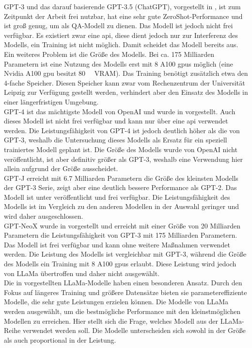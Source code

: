 GPT-3 und das darauf basierende GPT-3.5 (ChatGPT), vorgestellt in \citet{gpt3}, ist zum Zeitpunkt der Arbeit frei nutzbar, hat eine sehr gute ZeroShot-Performance und ist groß genug, um als QA-Modell zu dienen.
Das Modell ist jedoch nicht frei verfügbar.
Es existiert zwar eine \ac{api}, diese dient jedoch nur zur Interferenz des Modells, ein Training ist nicht möglich.
Damit scheidet das Modell bereits aus.
Ein weiteres Problem ist die Größe des Modells.
Bei ca. 175 Milliarden Parametern ist eine Nutzung des Modells erst mit 8 A100 \ac{gpu}s möglich (eine Nvidia A100 \ac{gpu} besitzt \SI{80}{\giga\byte} VRAM).
Das Training benötigt zusätzlich etwa den 4-fache Speicher.
Diesen Speicher kann zwar vom Rechenzentrum der Universität Leipzig zur Verfügung gestellt werden, verhindert aber den Einsatz des Modells in einer längerfristigen Umgebung.\\

GPT-4 ist das mächtigste Modell von OpenAI und wurde in \citet{gpt4} vorgestellt.
Auch dieses Modell ist nicht frei verfügbar und kann nur über eine \ac{api} verwendet werden.
Die Leistungsfähigkeit von GPT-4 ist jedoch deutlich höher als die von GPT-3, weshalb die Untersuchung dieses Modells als Ersatz für ein speziell trainiertes Modell geplant ist.
Die Größe des Modells wurde von OpenAI nicht veröffentlicht, ist aber definitiv größer als GPT-3, weshalb eine Verwendung hier allein aufgrund der Größe ausscheidet.\\

GPT-J erreicht mit \SI{6,7}{} Milliarden Parametern die Größe des kleinsten Modells der GPT-3 Serie, zeigt aber eine deutlich bessere Performance als GPT-2.
Das Modell ist unter \citet{gptj} veröffentlicht und frei verfügbar.
Die Leistungsfähigkeit des Modells ist im Vergleich zu den anderen Modellen in der Auswahl geringer und wird daher ausgeschlossen.\\

GPT-NeoX wurde in \citet{gpt_neox} vorgestellt und erreicht mit einer Größe von 20 Milliarden Parametern die Leistungsfähigkeit von GPT-3 mit 175 Milliarden Parametern.
Das Modell ist frei verfügbar und kann ohne weitere Maßnahmen verwendet werden.
Die Leistung des Modells ist vergleichbar mit GPT-3, während die Größe des Modells ein Training mit 8 A100 \ac{gpu}s erlaubt.
Diese Leistung wird jedoch von LLaMa übertroffen und daher nicht ausgewählt.\\

Die in \citet{llama} vorgestellten LLaMa-Modelle haben einen besonderen Ansatz.
Durch den Fokus auf längeres Training und größere Datensätze bieten sie parametereffiziente Modelle, die sehr gute Leistungen erzielen können.
Die Modelle von LLaMa werden ausgewählt, um die bestmögliche Performance mit den kleinstmöglichen Modellen zu erreichen.
Hier stellt sich die Frage, welches Modell aus der LLaMa-Reihe verwendet werden soll.
Die Modelle unterscheiden sich sowohl in der Größe als auch proportional in der Leistung.\\


